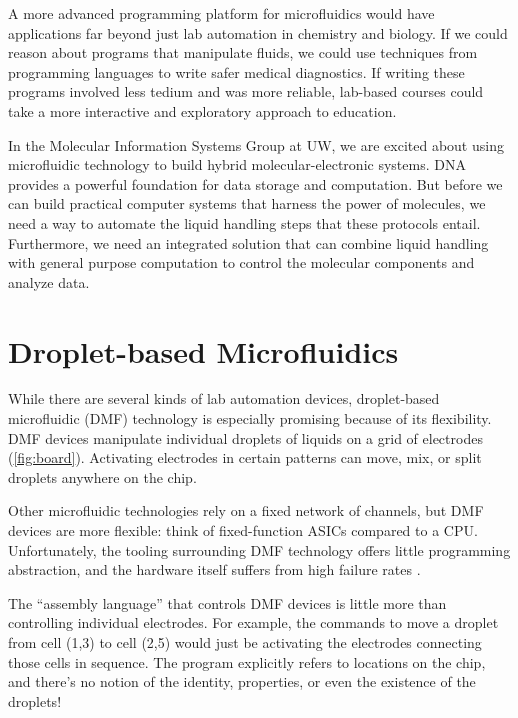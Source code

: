 \documentclass[
  10pt,
  a4paper,
  twocolumn,
]{article}
\begin{document}
A more advanced programming platform for microfluidics would have applications far beyond just lab automation in chemistry and biology.
If we could reason about programs that manipulate fluids, we could use techniques from programming languages to write safer medical diagnostics.
If writing these programs involved less tedium and was more reliable, lab-based courses could take a more interactive and exploratory approach to education.

In the Molecular Information Systems Group at UW, we are excited about using microfluidic technology to build hybrid molecular-electronic systems.
DNA provides a powerful foundation for data storage \cite{bornholt2016} and computation.
But before we can build practical computer systems that harness the power of molecules, we need a way to automate the liquid handling steps that these protocols entail.
Furthermore, we need an integrated solution that can combine liquid handling with general purpose computation to control the molecular components and analyze data.

\section*{Droplet-based Microfluidics}

While there are several kinds of lab automation devices,
droplet-based microfluidic (DMF) technology is especially promising because of its flexibility.
DMF devices manipulate individual droplets of liquids on a grid of electrodes (\autoref{fig:board}).
Activating electrodes in certain patterns can move, mix, or split droplets anywhere on the chip.

Other microfluidic technologies rely on a fixed network of channels, but DMF
devices are more flexible: think of fixed-function ASICs compared to a CPU.
Unfortunately, the tooling surrounding DMF technology offers little programming abstraction,
and the hardware itself suffers from high failure rates \cite{dmf-review}.

The ``assembly language'' that controls DMF devices is little more than controlling individual electrodes.
For example, the commands to move a droplet from cell (1,3) to cell (2,5) would just be activating the electrodes connecting those cells in sequence.
The program explicitly refers to locations on the chip, and there's no notion of the identity, properties, or even the existence of the droplets!
\end{document}
